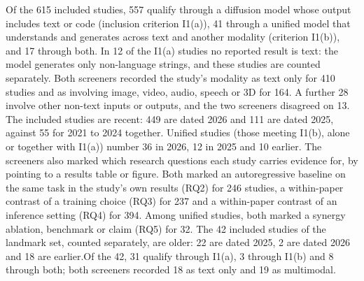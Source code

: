 Of the 615 included studies, 557 qualify through a diffusion model whose output includes text or code (inclusion criterion I1(a)), 41 through a unified model that understands and generates across text and another modality (criterion I1(b)), and 17 through both. In 12 of the I1(a) studies no reported result is text: the model generates only non-language strings, and these studies are counted separately.%
Both screeners recorded the study's modality as text only for 410 studies and as involving image, video, audio, speech or 3D for 164. A further 28 involve other non-text inputs or outputs, and the two screeners disagreed on 13.%
The included studies are recent: 449 are dated 2026 and 111 are dated 2025, against 55 for 2021 to 2024 together. Unified studies (those meeting I1(b), alone or together with I1(a)) number 36 in 2026, 12 in 2025 and 10 earlier.%
The screeners also marked which research questions each study carries evidence for, by pointing to a results table or figure. Both marked an autoregressive baseline on the same task in the study's own results (RQ2) for 246 studies, a within-paper contrast of a training choice (RQ3) for 237 and a within-paper contrast of an inference setting (RQ4) for 394. Among unified studies, both marked a synergy ablation, benchmark or claim (RQ5) for 32.%
The 42 included studies of the landmark set, counted separately, are older: 22 are dated 2025, 2 are dated 2026 and 18 are earlier.Of the 42, 31 qualify through I1(a), 3 through I1(b) and 8 through both; both screeners recorded 18 as text only and 19 as multimodal. %

